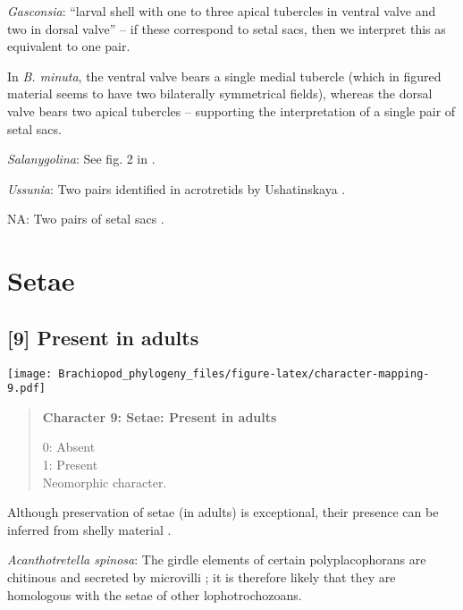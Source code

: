 \documentclass[openany]{book}
\theoremstyle{definition}
\theoremstyle{definition}
\theoremstyle{definition}
\theoremstyle{remark}
\begin{document}
\hypertarget{Gasconsia-coding-8}{}
\emph{Gasconsia}: ``larval shell with one to three apical tubercles in
ventral valve and two in dorsal valve''
\citep{Williams2000LinguliformeaCraniiformea} -- if these correspond to
setal sacs, then we interpret this as equivalent to one pair.

In \emph{B. minuta}, the ventral valve bears a single medial tubercle
(which in figured material seems to have two bilaterally symmetrical
fields), whereas the dorsal valve bears two apical tubercles
\citep{Li2004} -- supporting the interpretation of a single pair of
setal sacs.

\hypertarget{Salanygolina-coding-8}{}
\emph{Salanygolina}: See fig. 2 in \citet{Balthasar2009Thebrachiopod}.

\hypertarget{Ussunia-coding-8}{}
\emph{Ussunia}: Two pairs identified in acrotretids by Ushatinskaya
\citeyearpar{Ushatinskaya2016Protegulumand}.

\hypertarget{NA-coding-8}{}
NA: Two pairs of setal sacs \citep{Popov2009Earlyontogeny}.

\section{Setae}\label{setae}

\subsection*{{[}9{]} Present in adults}\label{present-in-adults}

\texttt{[image: Brachiopod\_phylogeny\_files/figure-latex/character-mapping-9.pdf]}

\begin{quote}
\textbf{Character 9: Setae: Present in adults}

0: Absent\\
1: Present\\
Neomorphic character.
\end{quote}

Although preservation of setae (in adults) is exceptional, their
presence can be inferred from shelly material
\citep[see][]{Holmer2006Aspinose}.

\hypertarget{Acanthotretella_spinosa-coding-9}{}
\emph{Acanthotretella spinosa}: The girdle elements of certain
polyplacophorans are chitinous and secreted by microvilli
\citep{Fischer1980, Leise1982, Leise1988}; it is therefore likely that
they are homologous with the setae of other lophotrochozoans.
\end{document}
